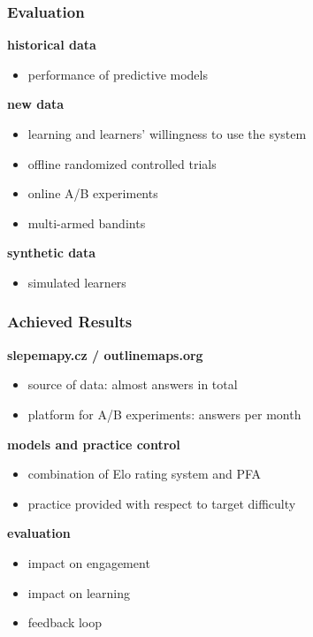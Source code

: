 \documentclass[xcolor=svgnames]{beamer}
\renewcommand{\cite}[1]{{\small\parencite{#1}}}
\begin{document}
\begin{frame}
	\frametitle{Evaluation}
	\textbf{historical data}
	\begin{itemize}
		\item performance of predictive models\\\cite{pelanek2014brief, huang2015framework}
	\end{itemize}
	\textbf{new data}
	\begin{itemize}
		\item learning and learners' willingness to use the system
		\item offline randomized controlled trials~\cite{dimitrov2003pretest}
		\item online A/B experiments~\cite{stamper2012rise}
		\item multi-armed bandints~\cite{liu2014trading}
	\end{itemize}
	\textbf{synthetic data}
	\begin{itemize}
		\item simulated learners~\cite{fancsali2013optimal}
	\end{itemize}
\end{frame}
\begin{frame}
	\frametitle{Achieved Results}
	\textbf{slepemapy.cz / outlinemaps.org}
	\begin{itemize}
		\item source of data: almost  answers in total
		\item platform for A/B experiments:  answers per month
	\end{itemize}
	\textbf{models and practice control}
	\begin{itemize}
		\item combination of Elo rating system and PFA
		\item practice provided with respect to target difficulty\\\cite{papousek2014adaptive}
	\end{itemize}
	\textbf{evaluation}
	\begin{itemize}
		\item impact on engagement~\cite{papousek2015impact}
		\item impact on learning~\cite{papousek2016evaluation}
		\item feedback loop~\cite{niznan2015exploring, pelanek2016impact}
	\end{itemize}
\end{frame}
\end{document}
